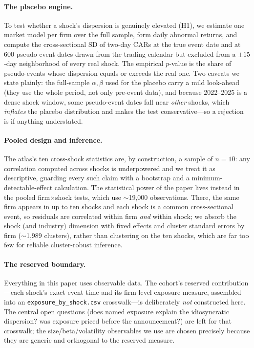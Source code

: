 \documentclass[12pt]{article}
\begin{document}
\paragraph{The placebo engine.} To test whether a shock's dispersion is genuinely elevated
(H1), we estimate one market model per firm over the full sample, form daily abnormal returns, and
compute the cross-sectional SD of two-day CARs at the true event date and at $600$ pseudo-event
dates drawn from the trading calendar but excluded from a $\pm 15$-day neighborhood of every real
shock. The empirical $p$-value is the share of pseudo-events whose dispersion equals or exceeds the
real one. Two caveats we state plainly: the full-sample $\alpha,\beta$ used for the placebo carry a
mild look-ahead (they use the whole period, not only pre-event data), and because 2022--2025 is a
dense shock window, some pseudo-event dates fall near \emph{other} shocks, which \emph{inflates} the
placebo distribution and makes the test conservative---so a rejection is if anything understated.

\paragraph{Pooled design and inference.} The atlas's ten cross-shock statistics are, by
construction, a sample of $n=10$: any correlation computed across shocks is underpowered and we
treat it as descriptive, guarding every such claim with a bootstrap and a minimum-detectable-effect
calculation. The statistical power of the paper lives instead in the pooled firm$\times$shock
tests, which use $\sim$19{,}000 observations. There, the same firm appears in up to ten shocks and
each shock is a common cross-sectional event, so residuals are correlated within firm \emph{and}
within shock; we absorb the shock (and industry) dimension with fixed effects and cluster standard
errors by firm ($\sim$1{,}989 clusters), rather than clustering on the ten shocks, which are far too
few for reliable cluster-robust inference.

\paragraph{The reserved boundary.} Everything in this paper uses observable data. The cohort's
reserved contribution---each shock's exact event time and its firm-level exposure measure, assembled
into an \texttt{exposure\_by\_shock.csv} crosswalk---is deliberately \emph{not} constructed here. The
central open questions (does named exposure explain the idiosyncratic dispersion? was exposure
priced before the announcement?) are left for that crosswalk; the size/beta/volatility observables
we use are chosen precisely because they are generic and orthogonal to the reserved measure.
\end{document}
